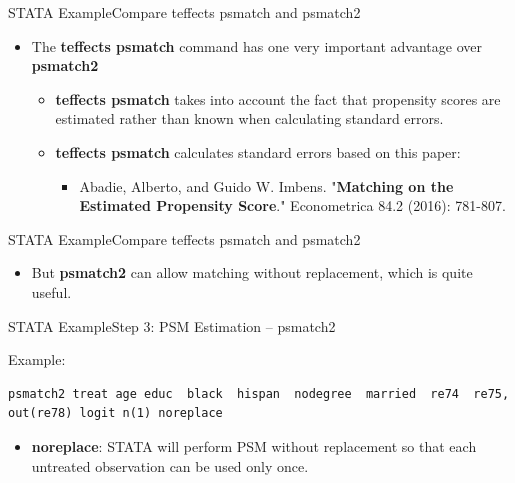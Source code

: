 \documentclass[hyperref={pdfpagelabels=false}]{beamer}
\begin{document}
\begin{frame}[fragile]{STATA Example}{Compare teffects psmatch and psmatch2}
	\begin{itemize}
		\item The \textbf{teffects psmatch} command has one very important advantage over \textbf{psmatch2}
				\vspace{0.2cm}
			\begin{itemize}		
				\item \textbf{teffects psmatch} takes into account the fact that propensity scores are estimated rather than known when calculating standard errors.
								\vspace{0.2cm}
				\item \textbf{teffects psmatch} calculates standard errors based on this paper:
												\vspace{0.2cm}
							\begin{itemize}		
\item Abadie, Alberto, and Guido W. Imbens. "\textbf{Matching on the Estimated Propensity Score}." Econometrica 84.2 (2016): 781-807.
								\end{itemize}	
				
				\end{itemize}	
	\end{itemize}
\end{frame}



\begin{frame}[fragile]{STATA Example}{Compare teffects psmatch and psmatch2}
	\begin{itemize}
		\item But \textbf{psmatch2} can allow matching without replacement, which is quite useful. 
		
		
	\end{itemize}
\end{frame}



\begin{frame}[fragile]{STATA Example}{Step 3: PSM Estimation -- psmatch2}
	\item Example:
\begin{lstlisting}
psmatch2 treat age educ  black  hispan  nodegree  married  re74  re75, out(re78) logit n(1) noreplace
\end{lstlisting}
	\begin{itemize}
		\vspace{0.2cm}
		\item \textbf{noreplace}: STATA will perform PSM without replacement so that each untreated observation can be used only once.
	\end{itemize}
\end{frame}
\end{document}
